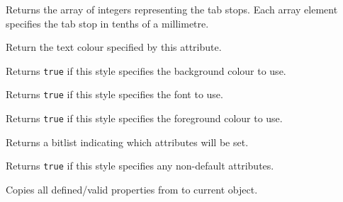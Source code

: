 \label{wxtextattrgettabs}


Returns the array of integers representing the tab stops. Each
array element specifies the tab stop in tenths of a millimetre.


\label{wxtextattrgettextcolour}


Return the text colour specified by this attribute.


\label{wxtextattrhasbackgroundcolour}


Returns {\tt true} if this style specifies the background colour to use.


\label{wxtextattrhasfont}


Returns {\tt true} if this style specifies the font to use.


\label{wxtextattrhastextcolour}


Returns {\tt true} if this style specifies the foreground colour to use.


\label{wxtextattrgetflags}


Returns a bitlist indicating which attributes will be set.


\label{wxtextattrisdefault}


Returns {\tt true} if this style specifies any non-default attributes.


\label{wxtextattrmerge}


Copies all defined/valid properties from  to current object.



